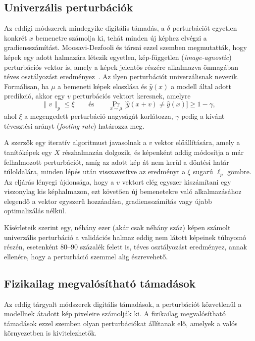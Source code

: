 \subsection{Univerzális perturbációk}
Az eddigi módszerek mindegyike digitális támadás, a $\delta$ perturbációt egyetlen konkrét $x$ bemenetre számolja ki, tehát 
minden új képhez elvégzi a gradiensszámítást. 
Moosavi-Dezfooli és társai ezzel szemben megmutatták, hogy képek egy adott halmazára létezik egyetlen, kép-független 
(\textit{image-agnostic}) perturbációs vektor is, amely a képek jelentős részére alkalmazva önmagában téves osztályozást 
eredményez~\cite{moosavidezfooli2017universal}. 
Az ilyen perturbációt univerzálisnak nevezik. 
Formálisan, ha $\mu$ a bemeneti képek eloszlása és $\hat{y}(x)$ a modell által adott predikció, akkor egy $v$ perturbációs 
vektort keresnek, amelyre 
\[
  \|v\|_p \leq \xi \qquad \text{és} \qquad \Pr_{x\sim\mu}\big[\hat{y}(x+v) \neq \hat{y}(x)\big] \geq 1-\gamma,
\]
ahol $\xi$ a megengedett perturbáció nagyságát korlátozza, $\gamma$ pedig a kívánt tévesztési arányt (\textit{fooling rate}) 
határozza meg. 

A szerzők egy iteratív algoritmust javasolnak a $v$ vektor előállítására, amely a tanítóképek egy $X$ részhalmazán dolgozik, és 
képenként addig módosítja a már felhalmozott perturbációt, amíg az adott kép át nem kerül a döntési határ túloldalára, minden 
lépés után visszavetítve az eredményt a $\xi$ sugarú $\ell_p$ gömbre. 
Az eljárás lényegi újdonsága, hogy a $v$ vektort elég egyszer kiszámítani egy viszonylag kis képhalmazon, ezt követően új 
bemenetekre való alkalmazásához elegendő a vektor egyszerű hozzáadása, gradiensszámítás vagy újabb optimalizálás nélkül. 

Kísérleteik szerint egy, néhány ezer (akár csak néhány száz) képen számolt univerzális perturbáció a validációs halmaz eddig nem 
látott képeinek túlnyomó részén, esetenként 80--90 százalék felett is, téves osztályozást eredményez, annak ellenére, hogy 
a perturbáció szemmel alig észrevehető. 

\subsection{Fizikailag megvalósítható támadások}
Az eddig tárgyalt módszerek digitális támadások, a perturbációt közvetlenül a modellnek átadott kép pixeleire számolják ki. 
A fizikailag megvalósítható támadások ezzel szemben olyan perturbációkat állítanak elő, amelyek a valós környezetben is 
kivitelezhetők. 

